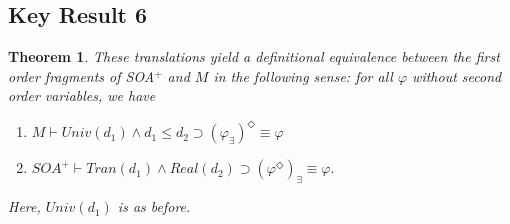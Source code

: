 \documentclass{article}
\newtheorem{theorem}{Theorem}
\begin{document}
\subsection{Key Result 6}
\begin{theorem}
    These translations yield a definitional equivalence 
    between the first order fragments of SOA$^+$ and $M$ in the following sense: for all 
    $\varphi$ without second order variables, we have
    \begin{enumerate}
        \item $M \vdash Univ(d_1) \wedge d_1 \leq d_2 \supset (\varphi_\exists)^\Diamond \equiv \varphi$
        \item $SOA^+ \vdash Tran(d_1) \wedge Real(d_2) \supset (\varphi^\Diamond)_\exists \equiv \varphi.$
    \end{enumerate}
    Here, $Univ(d_1)$ is as before. 
    \end{theorem}
\end{document}
